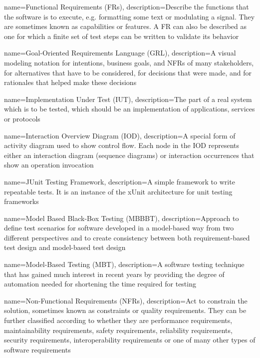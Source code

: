 {
	name={Functional Requirements (FRs)},
	description={Describe the functions that the software is to execute, e.g. formatting some text or modulating a signal. They are sometimes known as capabilities or features. A FR can also be described as one for which a finite set of test steps can be written to validate its behavior \cite{SWEBOK}}
}

{
	name={Goal-Oriented Requirements Language (GRL)},
	description={A visual modeling notation for intentions, business goals, and NFRs of many stakeholders, for alternatives that have to be considered, for decisions that were made, and for rationales that helped make these decisions \cite{Amyot2011}}
}

{
	name={Implementation Under Test (IUT)},
	description={The part of a real system which is to be tested, which should be an implementation of applications, services or protocols \cite{ETSI2021}}
}

{
	name={Interaction Overview Diagram (IOD)},
	description={A special form of activity diagram used to show control flow. Each node in the IOD represents either an interaction diagram (sequence diagrams) or interaction occurrences that show an operation invocation \cite{NajlaRaza2007}}
}

{
	name={JUnit Testing Framework},
	description={A simple framework to write repeatable tests. It is an instance of the xUnit architecture for unit testing frameworks \cite{JUnit4}}
}

{
	name={Model Based Black-Box Testing (MBBBT)},
	description={Approach to define test scenarios for software developed in a model-based way from two different perspectives and to create consistency between both requirement-based test design and model-based test design \cite{Conrad2005}}
}

{
	name={Model-Based Testing (MBT)},
	description={A software testing technique that has gained much interest in recent years by providing the degree of automation needed for shortening the time required for testing \cite{Paper1}}
}

{
	name={Non-Functional Requirements (NFRs)},
	description={Act to constrain the solution, sometimes known as constraints or quality requirements. They can be further classified according to whether they are performance requirements, maintainability requirements, safety requirements, reliability requirements, security requirements, interoperability requirements or one of many other types of software requirements \cite{SWEBOK}}
}

